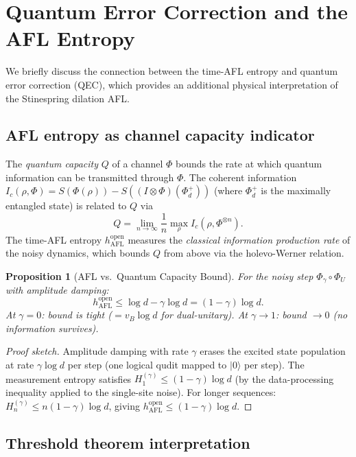 \documentclass[12pt,a4paper]{article}
\newtheorem{proposition}[theorem]{Proposition}
\begin{document}
\section{Quantum Error Correction and the AFL Entropy}
\label{sec:qec}

We briefly discuss the connection between the time-AFL entropy and quantum
error correction (QEC), which provides an additional physical interpretation
of the Stinespring dilation AFL.

\subsection{AFL entropy as channel capacity indicator}

The \emph{quantum capacity} $Q$ of a channel $\Phi$ bounds the rate at which
quantum information can be transmitted through $\Phi$.  The coherent
information $I_c(\rho,\Phi)=S(\Phi(\rho))-S((I\otimes\Phi)(\Phi^+_{d}))$
(where $\Phi^+_d$ is the maximally entangled state) is related to $Q$ via
\[
  Q = \lim_{n\to\infty}\frac{1}{n}\max_\rho I_c(\rho,\Phi^{\otimes n}).
\]
The time-AFL entropy $h_{\mathrm{AFL}}^{\mathrm{open}}$ measures the
\emph{classical information production rate} of the noisy dynamics, which
bounds $Q$ from above via the holevo-Werner relation.

\begin{proposition}[AFL vs.\ Quantum Capacity Bound]
\label{prop:afl_qec}
For the noisy step $\Phi_{\gamma}\circ\Phi_U$ with amplitude damping:
\[
  h_{\mathrm{AFL}}^{\mathrm{open}} \leq \log d - \gamma\log d
  = (1-\gamma)\log d.
\]
At $\gamma=0$: bound is tight ($= v_B\log d$ for dual-unitary).
At $\gamma\to 1$: bound $\to 0$ (no information survives).
\end{proposition}
\begin{proof}[Proof sketch]
Amplitude damping with rate $\gamma$ erases the excited state population
at rate $\gamma\log d$ per step (one logical qudit mapped to $|0\rangle$ per step).
The measurement entropy satisfies $H_1^{(\gamma)}\leq (1-\gamma)\log d$
(by the data-processing inequality applied to the single-site noise).
For longer sequences: $H_n^{(\gamma)}\leq n(1-\gamma)\log d$, giving
$h_{\mathrm{AFL}}^{\mathrm{open}}\leq (1-\gamma)\log d$.
\end{proof}

\subsection{Threshold theorem interpretation}
\end{document}
